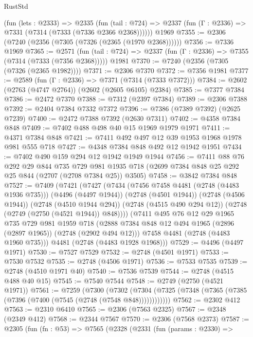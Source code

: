 \begin{lexlean}{RustStd}
\begin{coremodule}
    (fun (lets : @2333) =>
    @2335
      (fun (tail : @724) => @2337 (fun (Γ : @2336) => @7331 (@7314 (@7333 (@7336 @2366 @2368))))))
    @1969
@7355 := @2306 (@7240 (@2356 (@7305 (@7326 (@2365 (@1970 @2368))))))
@7356 := @7336 @1969
@7365 := @2571
    (fun (tail : @724) => @2337 (fun (Γ : @2336) => @7355 (@7314 (@7333 (@7356 @2368)))))
    @1981
@7370 := @7240 (@2356 (@7305 (@7326 (@2365 @1982))))
@7371 := @2306 @7370
@7372 := @7356 @1981
@7377 := @2589 (fun (Γ : @2336) => @7371 (@7314 (@7333 @7372)))
@7384 := @2602 (@2763 (@4747 @2764)) (@2602 (@2605 @6105) @2384)
@7385 := @7377 @7384
@7386 := @2472 @7370
@7388 := @7312 (@2397 @7384)
@7389 := @2306 @7388
@7392 := @2404 @7384 @7332 @7372
@7396 := @7386 (@7389 @7392) (@2625 @7239)
@7400 := @2472 @7388 @7392 (@2630 @7311)
@7402 := @4358 @7384 @848
@7409 := @7402 @488 @498 @40 @15 @1969 @1979 @1971
@7411 := @4371 @7384 @848
@7421 := @7411 @492 @497 @12 @39 @1953 @1968 @1978 @981 @555 @718
@7427 := @4348 @7384 @848 @492 @12 @1942 @1951
@7434 := @7402 @490 @159 @294 @12 @1942 @1949 @1944
@7456 := @7411
    @88
    @76
    @292
    @29
    @844
    @735
    @729
    @981
    @1935
    @718
    (@2699 @7384 @848 @25 @292 @25 @844 (@2707 (@2708 @7384 @25)) @3505)
@7458 := @3842 @7384 @848
@7527 := @7409
    (@7421
      (@7427
        (@7434
          (@7456 @7458 @4481 (@2748 (@4483 @1936 @735)))
          (@4496 (@4497 @1944))
          (@2748 (@4501 @1944))
          (@2748 (@4506 @1944))
          (@2748 (@4510 @1944 @294))
          (@2748 (@4515 @490 @294 @12))
          (@2748 (@2749 (@2750 (@4521 @1944)) @848))))
      (@7411
        @495
        @76
        @12
        @29
        @1965
        @735
        @729
        @981
        @1959
        @718
        (@2888 @7384 @848 @12 @494 @1965 (@2896 (@2897 @1965)) (@2748 (@2902 @494 @12)))
        @7458
        @4481
        (@2748 (@4483 @1960 @735)))
      @4481
      (@2748 (@4483 @1928 @1968)))
@7529 := @4496 (@4497 @1971)
@7530 := @7527 @7529
@7532 := @2748 (@4501 @1971)
@7533 := @7530 @7532
@7535 := @2748 (@4506 @1971)
@7536 := @7533 @7535
@7539 := @2748 (@4510 @1971 @40)
@7540 := @7536 @7539
@7544 := @2748 (@4515 @488 @40 @15)
@7545 := @7540 @7544
@7548 := @2749 (@2750 (@4521 @1971))
@7561 := @7259
    (@7300
      (@7302 (@7304 (@7325 (@7348 (@7365 (@7385 (@7396 (@7400 (@7545 (@2748 (@7548 @848))))))))))))
@7562 := @2302 @412
@7563 := @2310 @6410
@7565 := @2306 (@7563 @2325)
@7567 := @2348 (@2349 @412)
@7568 := @2344 @7567
@7570 := @2306 (@7568 @2373)
@7587 := @2305
    (fun (fn : @53) =>
    @7565
      (@2328
        (@2331
          (fun (params : @2330) =>

\end{coremodule}
\end{lexlean}
